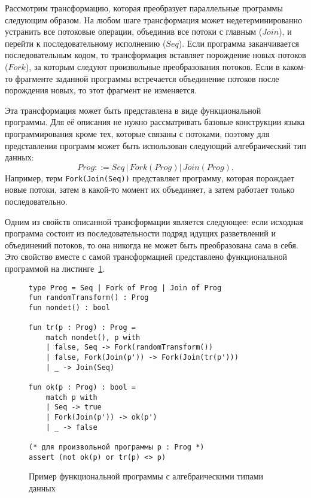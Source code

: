 \begin{example}[$ForkJoin$]\label{ex:fork-join-chcs}
Рассмотрим трансформацию, которая преобразует параллельные программы следующим образом. 
На любом шаге трансформация может недетерминированно устранить все потоковые операции, объединив все потоки с главным ($Join$), и перейти к последовательному исполнению ($Seq$).
Если программа заканчивается последовательным кодом, то трансформация вставляет порождение новых потоков ($Fork$), за которым следуют произвольные преобразования потоков.
Если в каком-то фрагменте заданной программы встречается объединение потоков после порождения новых, то этот фрагмент не изменяется.

Эта трансформация может быть представлена в виде функциональной программы. Для её описания не нужно рассматривать базовые конструкции языка программирования кроме тех, которые связаны с потоками, поэтому для представления программ может быть использован следующий алгебраический тип данных:
$$ Prog ::= Seq\,|\,Fork(Prog)|\,Join(Prog). $$
Например, терм \texttt{Fork(Join(Seq))} представляет программу, которая порождает новые потоки, затем в какой-то момент их объединяет, а затем работает только последовательно.

Одним из свойств описанной трансформации является следующее: если исходная программа состоит из последовательности подряд идущих разветвлений и объединений потоков, то она никогда не может быть преобразована сама в себя.
Это свойство вместе с самой трансформацией представлено функциональной программой на листинге~\ref{fig:ex-fork-join}.
{\renewcommand{\figurename}{Листинг}
\begin{figure}
    \centering
\begin{verbatim}
type Prog = Seq | Fork of Prog | Join of Prog
fun randomTransform() : Prog
fun nondet() : bool

fun tr(p : Prog) : Prog =
    match nondet(), p with
    | false, Seq -> Fork(randomTransform())
    | false, Fork(Join(p')) -> Fork(Join(tr(p')))
    | _ -> Join(Seq)

fun ok(p : Prog) : bool =
    match p with
    | Seq -> true
    | Fork(Join(p')) -> ok(p')
    | _ -> false

(* для произвольной программы p : Prog *)
assert (not ok(p) or tr(p) <> p)
\end{verbatim}
    \caption{Пример функциональной программы с алгебраическими типами данных}
    \label{fig:ex-fork-join}
\end{figure}}


\end{example}
